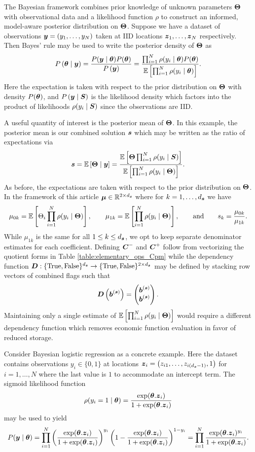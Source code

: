 \documentclass{article}[12pt]
\begin{document}
The Bayesian framework combines prior knowledge of unknown parameters $\boldsymbol{\Theta}$ with observational data and a likelihood function $\rho$ to construct an informed, model-aware posterior distribution on $\boldsymbol{\Theta}$. Suppose we have a dataset of observations $\boldsymbol{y} = (y_1,\dots,y_{N})$ taken at IID locations $\boldsymbol{z}_1,\dots,\boldsymbol{z}_{N}$ respectively. Then Bayes' rule may be used to write the posterior density of $\boldsymbol{\Theta}$ as 
$$P\left(\boldsymbol{\theta} \mid \boldsymbol{y} \right) = \frac{P(\boldsymbol{y} \mid \boldsymbol{\theta}) P(\boldsymbol{\theta})}{P\left(\boldsymbol{y}\right)} = \frac{\prod_{i=1}^{N} \rho(y_i \mid \boldsymbol{\theta}) P(\boldsymbol{\theta})}{\mathbb{E}\left[\prod_{i=1}^{N} \rho(y_i \mid \boldsymbol{\theta})\right]}.$$
Here the expectation is taken with respect to the prior distribution on $\boldsymbol{\Theta}$ with density $P(\boldsymbol{\theta})$, and $P\left(\boldsymbol{y} \mid \boldsymbol{S} \right)$ is the likelihood density which factors into the product of likelihoods $\rho(y_i \mid \boldsymbol{S})$ since the observations are IID. 

A useful quantity of interest is the posterior mean of $\boldsymbol{\Theta}$. In this example, the posterior mean is our combined solution $\boldsymbol{s}$ which may be written as the ratio of expectations via
$$\boldsymbol{s} = \mathbb{E}\left[\boldsymbol{\Theta} \mid \boldsymbol{y}\right] = \frac{\mathbb{E}\left[\boldsymbol{\Theta} \prod_{i=1}^{N} \rho(y_i \mid \boldsymbol{S})\right]}{\mathbb{E}\left[\prod_{i=1}^{N} \rho(y_i \mid \boldsymbol{\Theta})\right]}.$$
As before, the expectations are taken with respect to the prior distribution on $\boldsymbol{\Theta}$. In the framework of this article $\boldsymbol{\mu} \in \mathbb{R}^{2 \times d_{\boldsymbol{s}}}$ where for $k=1,\dots,d_{\boldsymbol{s}}$ we have 
$$\mu_{0k} = \mathbb{E}\left[\Theta_i \prod_{i=1}^{N} \rho(y_i \mid \boldsymbol{\Theta})\right], \qquad \mu_{1k} = \mathbb{E}\left[\prod_{i=1}^{N} \rho(y_i \mid \boldsymbol{\Theta})\right], \qquad \text{and} \qquad s_k = \frac{\mu_{0k}}{\mu_{1k}}.$$
While $\mu_{1k}$ is the same for all $1 \leq k \leq d_{\boldsymbol{s}}$, we opt to keep separate denominator estimates for each coefficient. Defining $\boldsymbol{C}^-$ and $\boldsymbol{C}^+$ follow from vectorizing the quotient forms in Table \ref{table:elementary_ops_Cpm} while the dependency function $\boldsymbol{D}: \{\text{True},\text{False}\}^{d_{\boldsymbol{s}}} \to \{\text{True},\text{False}\}^{2 \times d_{\boldsymbol{s}}}$ may be defined by stacking row vectors of combined flags such that
$$\boldsymbol{D}\left(\boldsymbol{b}^{(\boldsymbol{s})}\right) = \begin{pmatrix} \boldsymbol{b}^{(\boldsymbol{s})} \\ \boldsymbol{b}^{(\boldsymbol{s})} \end{pmatrix}.$$
Maintaining only a single estimate of $\mathbb{E}\left[\prod_{i=1}^{N} \rho(y_i \mid \boldsymbol{\Theta})\right]$ would require a different dependency function which removes economic function evaluation in favor of reduced storage. 

Consider Bayesian logistic regression as a concrete example. Here the dataset contains observations $y_i \in \{0,1\}$ at locations $\boldsymbol{z}_i = \left(z_{i1},\dots,z_{i(d_{\boldsymbol{s}}-1)},1\right)$ for $i=1,\dots,N$ where the last value is $1$ to accommodate an intercept term. The sigmoid likelihood function
$$\rho(y_i = 1 \mid \boldsymbol{\theta}) = \frac{\exp(\boldsymbol{\theta}.\boldsymbol{z}_i)}{1+\exp(\boldsymbol{\theta}.\boldsymbol{z}_i)}$$
may be used to yield
$$P(\boldsymbol{y} \mid \boldsymbol{\theta}) = \prod_{i=1}^N \left(\frac{\exp(\boldsymbol{\theta}.\boldsymbol{z}_i)}{1+\exp(\boldsymbol{\theta}.\boldsymbol{z}_i)}\right)^{y_i} \left(1-\frac{\exp(\boldsymbol{\theta}.\boldsymbol{z}_i)}{1+\exp(\boldsymbol{\theta}.\boldsymbol{z}_i)}\right)^{1-y_i} = \prod_{i=1}^N \frac{\exp(\boldsymbol{\theta}.\boldsymbol{z}_i)^{y_i}}{1+\exp(\boldsymbol{\theta}.\boldsymbol{z}_i)}.$$
\end{document}
